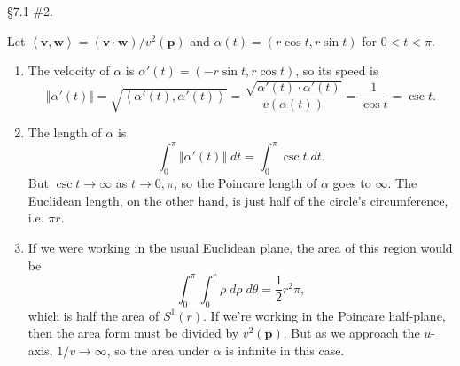 \documentclass[10pt]{report}
\begin{document}
\begin{exer}[]
\S 7.1 \#2.
\end{exer}
Let $\left\langle \mathbf{v},\mathbf{w} \right\rangle=(\mathbf{v}\cdot \mathbf{w})/v^2(\mathbf{p})$ and $\alpha(t)=(r\cos t, r\sin t)$ for $0 < t < \pi$.
\begin{enumerate}
	\item The velocity of $\alpha$ is $\alpha'(t) = (-r \sin t, r\cos t)$, so its speed is
		\[
			{\Vert{\alpha'(t)}\Vert} = \sqrt{\left\langle \alpha'(t),\alpha'(t) \right\rangle} = \frac{\sqrt{\alpha'(t)\cdot \alpha'(t)} }{v(\alpha(t))} = \frac{1}{\cos t} = \csc t.
		\] 
	\item The length of $\alpha$ is
		\[
			\int_{0}^{\pi} {\Vert{\alpha'(t)}\Vert}\;dt = \int_{0}^{\pi} \csc t\;dt.
		\] But $\csc t \to \infty$ as $t \to 0,\pi$, so the Poincare length of $\alpha$ goes to $\infty$. The Euclidean length, on the other hand, is just half of the circle's circumference, i.e. $\pi r$.
	\item If we were working in the usual Euclidean plane, the area of this region would be
		\[
		\int_{0}^{\pi} \int_{0}^{r} \rho \;d\rho\;d\theta = \frac{1}{2} r^2 \pi,
	\] which is half the area of $S^1(r)$. If we're working in the Poincare half-plane, then the area form must be divided by $v^2(\mathbf{p})$. But as we approach the $u$-axis, $1/v \to \infty$, so the area under $\alpha$ is infinite in this case.
\end{enumerate}
\end{document}

